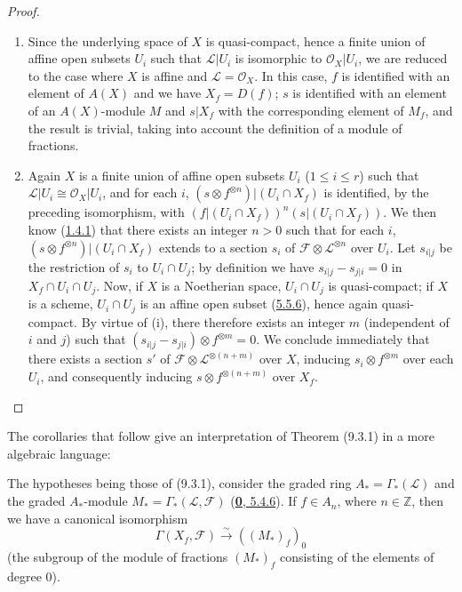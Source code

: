 \begin{proof}
\begin{enumerate}
\item[(i)] Since the underlying space of $X$ is quasi-compact, hence a
finite union of affine open subsets $U_i$ such that $\mathscr{L}|U_i$ is
isomorphic to $\mathscr{O}_X|U_i$, we are reduced to the case where $X$ is
affine and $\mathscr{L}=\mathscr{O}_X$. In this case, $f$ is identified
with an element of $A(X)$ and we have $X_f=D(f)$; $s$ is identified with an
element of an $A(X)$-module $M$ and $s|X_f$ with the corresponding element
of $M_f$, and the result is trivial, taking into account the definition of
a module of fractions.

\item[(ii)] Again $X$ is a finite union of affine open subsets $U_i$
($1\leq i\leq r$) such that $\mathscr{L}|U_i\cong\mathscr{O}_X|U_i$, and for
each $i$,
$(s\otimes f^{\otimes n})|(U_i\cap X_f)$ is identified, by the preceding
isomorphism, with
$(f|(U_i\cap X_f))^n(s|(U_i\cap X_f))$. We then know
(\hyperref[I.1.4.1]{1.4.1}) that there exists an integer $n>0$ such that
for each $i$, $(s\otimes f^{\otimes n})|(U_i\cap X_f)$ extends to a
section $s_i$ of $\mathscr{F}\otimes\mathscr{L}^{\otimes n}$ over
$U_i$. Let $s_{i|j}$ be the restriction of $s_i$ to $U_i\cap U_j$; by
definition we have $s_{i|j}-s_{j|i}=0$ in $X_f\cap U_i\cap U_j$. Now, if
$X$ is a Noetherian space, $U_i\cap U_j$ is quasi-compact; if $X$ is a
scheme, $U_i\cap U_j$ is an affine open subset
(\hyperref[I.5.5.6]{5.5.6}), hence again quasi-compact. By virtue of
(i), there therefore exists an integer $m$ (independent of $i$ and $j$)
such that $(s_{i|j}-s_{j|i})\otimes f^{\otimes m}=0$. We conclude
immediately that there exists a section $s'$ of
$\mathscr{F}\otimes\mathscr{L}^{\otimes(n+m)}$ over $X$, inducing
$s_i\otimes f^{\otimes m}$ over each $U_i$, and consequently inducing
$s\otimes f^{\otimes(n+m)}$ over $X_f$.
\end{enumerate}
\end{proof}

The corollaries that follow give an interpretation of Theorem (9.3.1) in a
more algebraic language:

\begin{corollary}[9.3.2]
\label{I.9.3.2}
The hypotheses being those of (9.3.1), consider the graded ring
$A_* = \Gamma_*(\mathscr{L})$ and the graded $A_*$-module
$M_* = \Gamma_*(\mathscr{L},\mathscr{F})$
\textup{(\hyperref[0.5.4.6]{\textbf{0}, 5.4.6})}. If $f\in A_n$, where $n\in\mathbb{Z}$,
then we have a canonical isomorphism
\[
  \Gamma(X_f,\mathscr{F})\xrightarrow{\sim}((M_*)_f)_0
\]
\textup{(the subgroup of the module of fractions $(M_*)_f$ consisting of the
elements of degree $0$)}.
\end{corollary}

